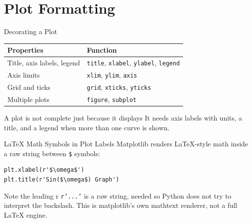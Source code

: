 \documentclass[9pt,aspectratio=169,xcolor=table]{beamer}
\newcommand{\striped}{\rowcolors{1}{white}{stripe}}
\begin{document}
\section{Plot Formatting}

\begin{frame}{Decorating a Plot}
    \leavevmode
    \small
    \striped
    \begin{center}
    \begin{tabular}{p{4.0cm}p{5.0cm}}
        \toprule
        \textbf{Properties} & \textbf{Function} \\
        \midrule
        Title, axis labels, legend & \texttt{title}, \texttt{xlabel},
        \texttt{ylabel}, \texttt{legend} \\
        Axis limits & \texttt{xlim}, \texttt{ylim}, \texttt{axis} \\
        Grid and ticks & \texttt{grid}, \texttt{xticks}, \texttt{yticks} \\
        Multiple plots & \texttt{figure}, \texttt{subplot} \\
        \bottomrule
    \end{tabular}
    \end{center}

    \vspace{3mm}
    \begin{alertblock}{A plot is not complete just because it displays}
        It needs axis labels with \alert{units}, a title, and a legend
        when more than one curve is shown.
    \end{alertblock}
\end{frame}

\begin{frame}[fragile]{LaTeX Math Symbols in Plot Labels}
    \leavevmode
    Matplotlib renders LaTeX-style math inside a \alert{raw string}
    between \texttt{\$} symbols:

\begin{lstlisting}
plt.xlabel(r'$\omega$')
plt.title(r'Sin($\omega$) Graph')
\end{lstlisting}

    \vspace{2mm}
    \begin{block}{Note the leading r}
        \texttt{r'...'} is a raw string, needed so Python does not try
        to interpret the backslash. This is matplotlib's own mathtext
        renderer, not a full LaTeX engine.
    \end{block}
\end{frame}
\end{document}
